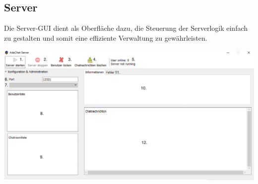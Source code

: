 \documentclass[12pt,a4paper,bibliography=totocnumbered,listof=totocnumbered]{scrartcl}
\begin{document}
\subsection{Server}
Die Server-GUI dient als Oberfläche dazu, die Steuerung der Serverlogik einfach zu gestalten und somit eine effiziente Verwaltung zu gewährleisten.

\begin{minipage}{\linewidth}
	\centering
	\includegraphics[width=1.0\linewidth]{img/Server_GUI.png}

\end{minipage}
\vspace{1em}
\end{document}
